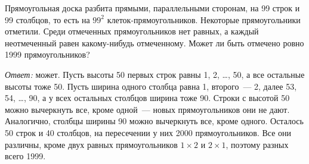 \problem
Прямоугольная доска разбита прямыми, параллельными сторонам, на 99 строк и 99
столбцов, то есть на $99^2$ клеток-прямо\-у\-голь\-ников.
Некоторые прямоугольники отметили.
Среди отмеченных прямоугольников нет равных, а каждый неотмеченный равен
какому-нибудь отмеченному.
Может ли быть отмечено ровно 1999 прямоугольников?

\solution
\emph{Ответ:} может.
Пусть высоты 50 первых строк равны 1, 2, \ldots, 50, а все остальные высоты
тоже 50.
Пусть ширина одного столбца равна 1, второго~--- 2, далее 53, 54, \ldots, 90, а
у всех остальных столбцов ширина тоже 90.
Строки с высотой 50 можно вычеркнуть все, кроме одной~--- новых прямоугольников
они не дают.
Аналогично, столбцы ширины 90 можно вычеркнуть все, кроме одного.
Осталось 50 строк и 40 столбцов, на пересечении у них 2000 прямоугольников.
Все они различны, кроме двух равных прямоугольников $1 \times 2$ и
$2 \times 1$, поэтому разных всего 1999.
\endproblem 
